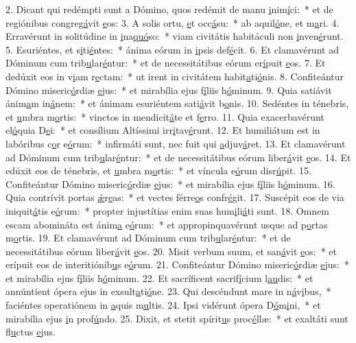 2. Dicant qui redémpti sunt a Dómino, quos redémit de manu \uline{i}nim\uline{í}ci:~* et de regiónibus congreg\uline{á}vit \uline{e}os:
3. A solis ortu, \uline{e}t occ\uline{á}su:~* ab aquil\uline{ó}ne, et m\uline{a}ri.
4. Erravérunt in solitúdine in \uline{i}na\uline{quó}so:~* viam civitátis habitáculi non \uline{i}nven\uline{é}runt.
5. Esuriéntes, et s\uline{i}ti\uline{é}ntes:~* ánima eórum in \uline{i}psis def\uline{é}cit.
6. Et clamavérunt ad Dóminum cum trib\uline{u}lar\uline{é}ntur:~* et de necessitátibus eórum er\uline{í}puit \uline{e}os.
7. Et dedúxit eos in v\uline{i}am r\uline{e}ctam:~* ut irent in civitátem habit\uline{a}ti\uline{ó}nis.
8. Confiteántur Dómino miseric\uline{ó}rdiæ \uline{e}jus:~* et mirabília ejus f\uline{í}liis h\uline{ó}minum.
9. Quia satiávit ánim\uline{a}m in\uline{á}nem:~* et ánimam esuriéntem sati\uline{á}vit b\uline{o}nis.
10. Sedéntes in ténebris, et \uline{u}mbra m\uline{o}rtis:~* vinctos in mendicit\uline{á}te et f\uline{e}rro.
11. Quia exacerbavérunt el\uline{ó}quia D\uline{e}i:~* et consílium Altíssimi irr\uline{i}tav\uline{é}runt.
12. Et humiliátum est in labóribus c\uline{o}r e\uline{ó}rum:~* infirmáti sunt, nec fuit qui \uline{a}djuv\uline{á}ret.
13. Et clamavérunt ad Dóminum cum trib\uline{u}lar\uline{é}ntur:~* et de necessitátibus eórum liber\uline{á}vit \uline{e}os.
14. Et edúxit eos de ténebris, et \uline{u}mbra m\uline{o}rtis:~* et víncula e\uline{ó}rum disr\uline{ú}pit.
15. Confiteántur Dómino miseric\uline{ó}rdiæ \uline{e}jus:~* et mirabília ejus f\uline{í}liis h\uline{ó}minum.
16. Quia contrívit portas \uline{ǽ}r\uline{e}as:~* et vectes férre\uline{o}s confr\uline{é}git.
17. Suscépit eos de via iniquit\uline{á}tis e\uline{ó}rum:~* propter injustítias enim suas hum\uline{i}li\uline{á}ti sunt.
18. Omnem escam abomináta est ánim\uline{a} e\uline{ó}rum:~* et appropinquavérunt usque ad p\uline{o}rtas m\uline{o}rtis.
19. Et clamavérunt ad Dóminum cum trib\uline{u}lar\uline{é}ntur:~* et de necessitátibus eórum liber\uline{á}vit \uline{e}os.
20. Misit verbum suum, et san\uline{á}vit \uline{e}os:~* et erípuit eos de interitiónib\uline{u}s e\uline{ó}rum.
21. Confiteántur Dómino miseric\uline{ó}rdiæ \uline{e}jus:~* et mirabília ejus f\uline{í}liis h\uline{ó}minum.
22. Et sacríficent sacrif\uline{í}cium l\uline{au}dis:~* et annúntient ópera ejus in exsult\uline{a}ti\uline{ó}ne.
23. Qui descéndunt mare in n\uline{á}v\uline{i}bus,~* faciéntes operatiónem in \uline{a}quis m\uline{u}ltis.
24. Ipsi vidérunt ópera D\uline{ó}m\uline{i}ni,~* et mirabília ejus \uline{i}n prof\uline{ú}ndo.
25. Dixit, et stetit spírit\uline{u}s proc\uline{é}llæ:~* et exaltáti sunt fl\uline{u}ctus \uline{e}jus.
